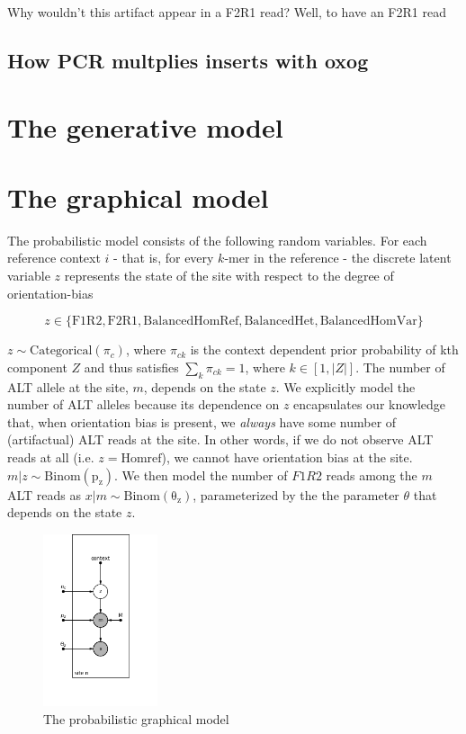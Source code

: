 \documentclass[a4paper]{article}
\begin{document}
Why wouldn't this artifact appear in a F2R1 read? Well, to have an F2R1 read

\subsection{How PCR multplies inserts with oxog}


\section{The generative model}
\section{The graphical model}
The probabilistic model consists of the following random variables. For each reference context $i$ - that is, for every $k$-mer in the reference - the discrete latent variable $z$ represents the state of the site with respect to the degree of orientation-bias 

\begin{equation}
z \in \{ \mathrm{F1R2}, \mathrm{F2R1}, \mathrm{Balanced Hom Ref}, \mathrm{ Balanced Het }, \mathrm{ Balanced Hom Var } \}
\end{equation}

$z \sim \mathrm{Categorical}(\pi_c)$, where $\pi_{ck}$ is the context dependent prior probability of kth component $Z$ and thus satisfies $\sum_k \pi_{ck} = 1$, where $k \in [1, |Z|]$. The number of ALT allele at the site, $m$, depends on the state $z$. We explicitly model the number of ALT alleles because its dependence on $z$ encapsulates our knowledge that, when orientation bias is present, we \textit{always} have some number of (artifactual) ALT reads at the site. In other words, if we do not observe ALT reads at all (i.e. $z = \mathrm{Hom ref}$), we cannot have orientation bias at the site. $m|z \sim \mathrm{Binom(p_z)}$. We then model the number of $F1R2$ reads among the $m$ ALT reads as $x|m \sim \mathrm{Binom(\theta_z)}$, parameterized by the the parameter $\theta$ that depends on the state $z$. 

\begin{figure}
\centering
\includegraphics[width=0.3\textwidth]{pgm.png}
\caption{\label{fig:pgm} The probabilistic graphical model}
\end{figure}
\end{document}
